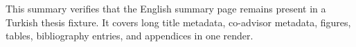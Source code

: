 This summary verifies that the English summary page remains present in a
Turkish thesis fixture. It covers long title metadata, co-advisor metadata,
figures, tables, bibliography entries, and appendices in one render.
